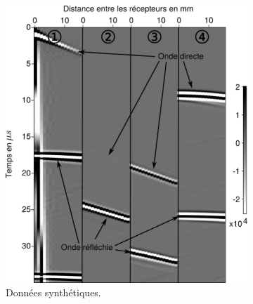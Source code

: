 \begin{figure}[h!]
	\begin{changemargin}{-1cm}{-2cm}
	\begin{subfigure}[b]{0.29\textwidth}
		\centering
		\includegraphics[width=\textwidth]{img/epsilon/e20.png}
		\caption{Données synthétiques.\label{app:ani:data_true}}
	\end{subfigure}
	\begin{subfigure}[b]{0.29\textwidth}
		\centering

\end{subfigure}
\end{changemargin}
\end{figure}
